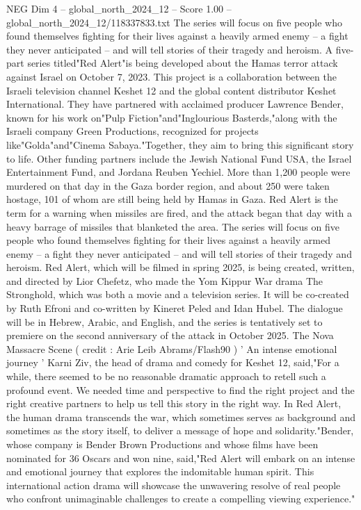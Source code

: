 \begin{textsample}{NEG Dim 4 – global\_north\_2024\_12 – Score 1.00 – global\_north\_2024\_12/118337833.txt}  \label{ex:f4_neg_135}
The series will focus on five people who found themselves fighting for their lives against a heavily armed enemy -- a fight they never anticipated -- and will tell stories of their tragedy and heroism.
A five-part series titled"Red Alert"is being developed about the Hamas terror attack against Israel on October 7, 2023.
This project is a collaboration between the Israeli television channel Keshet 12 and the global content distributor Keshet International.
They have partnered with acclaimed producer Lawrence Bender, known for his work on"Pulp Fiction"and"Inglourious Basterds,"along with the Israeli company Green Productions, recognized for projects like"Golda"and"Cinema Sabaya."Together, they aim to bring this significant story to life.
Other funding partners include the Jewish National Fund USA, the Israel Entertainment Fund, and Jordana Reuben Yechiel.
More than 1,200 people were murdered on that day in the Gaza border region, and about 250 were taken hostage, 101 of whom are still being held by Hamas in Gaza.
Red Alert is the term for a warning when missiles are fired, and the attack began that day with a heavy barrage of missiles that blanketed the area.
The series will focus on five people who found themselves fighting for their lives against a heavily armed enemy -- a fight they never anticipated -- and will tell stories of their tragedy and heroism.
Red Alert, which will be filmed in spring 2025, is being created, written, and directed by Lior Chefetz, who made the Yom Kippur War drama The Stronghold, which was both a movie and a television series.
It will be co-created by Ruth Efroni and co-written by Kineret Peled and Idan Hubel.
The dialogue will be in Hebrew, Arabic, and English, and the series is tentatively set to premiere on the second anniversary of the attack in October 2025.
The Nova Massacre Scene ( credit : Arie Leib Abrams/Flash90 ) ' An intense emotional journey ' Karni Ziv, the head of drama and comedy for Keshet 12, said,"For a while, there seemed to be no reasonable dramatic approach to retell such a profound event.
We needed time and perspective to find the right project and the right creative partners to help us tell this story in the right way.
In Red Alert, the human drama transcends the war, which sometimes serves as background and sometimes as the story itself, to deliver a message of hope and solidarity."Bender, whose company is Bender Brown Productions and whose films have been nominated for 36 Oscars and won nine, said,"Red Alert will embark on an intense and emotional journey that explores the indomitable human spirit.
This international action drama will showcase the unwavering resolve of real people who confront unimaginable challenges to create a compelling viewing experience."

\end{textsample}
